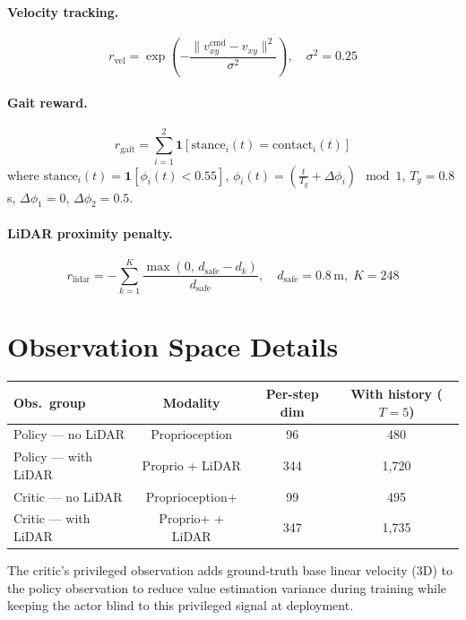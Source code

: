 \documentclass{article}
\begin{document}
\paragraph{Velocity tracking.}
\[
  r_\text{vel} = \exp\!\left(-\frac{\|v_{xy}^\text{cmd} - v_{xy}\|^2}{\sigma^2}\right),
  \quad \sigma^2 = 0.25
\]

\paragraph{Gait reward.}
\[
  r_\text{gait} = \sum_{i=1}^{2} \mathbf{1}\!\left[\text{stance}_i(t) = \text{contact}_i(t)\right]
\]
where $\text{stance}_i(t) = \mathbf{1}[\phi_i(t) < 0.55]$,
$\phi_i(t) = \left(\frac{t}{T_g} + \Delta\phi_i\right) \!\mod 1$,
$T_g = 0.8$\,s, $\Delta\phi_1 = 0$, $\Delta\phi_2 = 0.5$.

\paragraph{LiDAR proximity penalty.}
\[
  r_\text{lidar} = -\sum_{k=1}^{K} \frac{\max(0,\, d_\text{safe} - d_k)}{d_\text{safe}},
  \quad d_\text{safe} = 0.8\,\text{m},\; K = 248
\]

\section{Observation Space Details}
\label{app:obs}

\begin{center}
\begin{tabular}{lccc}
  \toprule
  \textbf{Obs.\ group} & \textbf{Modality} & \textbf{Per-step dim}
    & \textbf{With history ($T{=}5$)} \\
  \midrule
  Policy — no LiDAR & Proprioception & 96 & 480 \\
  Policy — with LiDAR & Proprio + LiDAR & 344 & 1{,}720 \\
  Critic — no LiDAR & Proprioception+ & 99 & 495 \\
  Critic — with LiDAR & Proprio+ + LiDAR & 347 & 1{,}735 \\
  \bottomrule
\end{tabular}
\end{center}

The critic's privileged observation adds ground-truth base linear velocity (3D)
to the policy observation to reduce value estimation variance during training
while keeping the actor blind to this privileged signal at deployment.
\end{document}
